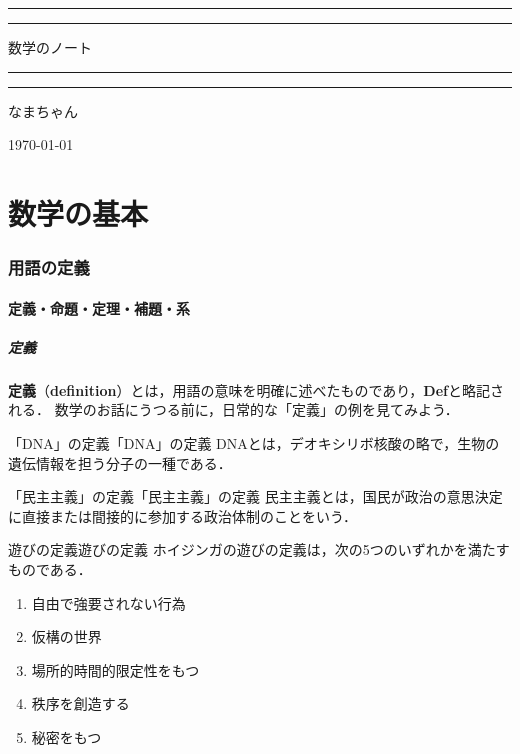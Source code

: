 \documentclass[a4paper,11pt]{ltjsarticle}
\renewcommand{\emph}[1]{\textbf{#1}}
\newcommand{\tituloum}[5]{
  \begin{titlepage}
    \begin{center}
        \pagecolor{white} %
        \color{mypurple} %
        
        \vspace*{2\baselineskip}
        
        \textcolor{mypurple}{\rule{\textwidth}{1.6pt}}\vspace*{-\baselineskip}\vspace*{2pt}
        \textcolor{mypurple}{\rule{\textwidth}{0.4pt}}
        
        \vspace{0.75\baselineskip}
        
        {\huge #1}
        
        \vspace{0.75\baselineskip}
        
        \textcolor{mypurple}{\rule{\textwidth}{0.4pt}}\vspace*{-\baselineskip}\vspace{3.2pt}
        \textcolor{mypurple}{\rule{\textwidth}{1.6pt}}
        
        \vspace{2\baselineskip}
        
        #3
        
        \vspace*{3\baselineskip}
        
        {\huge #2}
        
        \vspace{0.5\baselineskip}
        
        \textit{#4}
        
        \vfill
        
        \vspace{0.3\baselineskip}
        
        #5
        
    \end{center}
\end{titlepage}%
}
\begin{document}
\tituloum{数学のノート}{なまちゃん}{}{}{\today}

%

\thispagestyle{empty}

\newpage
{}
\pagecolor{white}

\localtableofcontents
\newpage


\part*{数学の基本}
\section{用語の定義}

\subsection{定義・命題・定理・補題・系}

\subsubsection{定義}

\emph{定義}（\emph{definition}）とは，用語の意味を明確に述べたものであり，\textbf{Def}と略記される．
数学のお話にうつる前に，日常的な「定義」の例を見てみよう．

\begin{example}{「DNA」の定義}{「DNA」の定義}
  DNAとは，デオキシリボ核酸の略で，生物の遺伝情報を担う分子の一種である．
\end{example}

\begin{example}{「民主主義」の定義}{「民主主義」の定義}
  民主主義とは，国民が政治の意思決定に直接または間接的に参加する政治体制のことをいう．
\end{example}

\begin{example}{遊びの定義}{遊びの定義}
  ホイジンガの遊びの定義は，次の5つのいずれかを満たすものである．
  \begin{enumerate}[(1)]
    \item 自由で強要されない行為
    \item 仮構の世界
    \item 場所的時間的限定性をもつ
    \item 秩序を創造する
    \item 秘密をもつ
  \end{enumerate}
\end{example}
\end{document}
